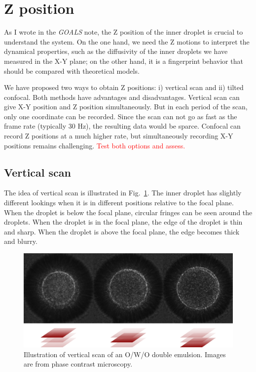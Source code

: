 \documentclass[onecolumn,aps, pre,amsmath,amssymb,longbibliography,11pt]{revtex4-2}
\begin{document}
\section{Z position}
As I wrote in the \textit{GOALS} note, the Z position of the inner droplet is crucial to understand the system.
On the one hand, we need the Z motions to interpret the dynamical properties, such as the diffusivity of the inner droplets we have measured in the X-Y plane;
on the other hand, it is a fingerprint behavior that should be compared with theoretical models.

We have proposed two ways to obtain Z positions: i) vertical scan and ii) tilted confocal.
Both methods have advantages and disadvantages.
Vertical scan can give X-Y position and Z position simultaneously.
But in each period of the scan, only one coordinate can be recorded.
Since the scan can not go as fast as the frame rate (typically 30 Hz), the resulting data would be sparce.
Confocal can record Z positions at a much higher rate, but simultaneously recording X-Y positions remains challenging.
\textcolor{red}{Test both options and assess.}

\subsection{Vertical scan}
The idea of vertical scan is illustrated in Fig.~\ref{fig:manual-scan}.
The inner droplet has slightly different lookings when it is in different positions relative to the focal plane.
When the droplet is below the focal plane, circular fringes can be seen around the droplets.
When the droplet is in the focal plane, the edge of the droplet is thin and sharp.
When the droplet is above the focal plane, the edge becomes thick and blurry.

\begin{figure}[h]
  \includegraphics{manual-scan.png}
  \caption{Illustration of vertical scan of an O/W/O double emulsion. Images are from phase contrast microscopy.}
  \label{fig:manual-scan}
\end{figure}
\end{document}
